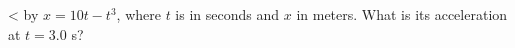 <%
by $x=10t-t^3$, where $t$ is in seconds and $x$ in meters.
What is its acceleration at $t=3.0$ s?
